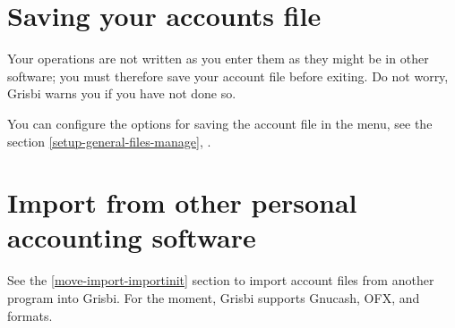 

\section{Saving your accounts file\label{start-save}}

Your operations are not written as you enter them as they might be in other software; you must therefore save your account file before exiting. Do not worry, Grisbi warns you if you have not done so.

You can configure the options for saving the account file in the   menu, see the section \vref{setup-general-files-manage}, .


\section{Import from other personal accounting software}

See the \vref{move-import-importinit} section to import account files from another program into Grisbi. For the moment, Grisbi supports \gls{Gnucash}, \gls{OFX},  and  formats.


